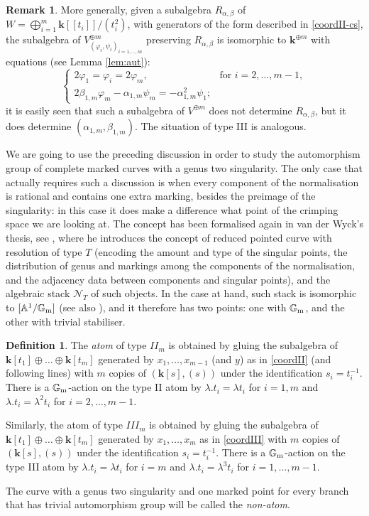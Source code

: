 \documentclass[11pt]{amsart}
\renewcommand{\k}{\mathbf k}
\newcommand{\Aaff}{\mathbb A}
\newcommand{\Gm}{\mathbb{G}_{\rm{m}}}
\theoremstyle{plain}
\theoremstyle{definition}
\newtheorem{dfn}[thm]{Definition}
\newtheorem{rem}[thm]{Remark}
\begin{document}
\begin{rem}
 More generally, given a subalgebra $R_{\alpha,\beta}$ of $W=\bigoplus_{i=1}^m\k[[t_i]]/(t_i^2)$, with generators of the form described in \eqref{coordII-cs}, the subalgebra of $V^{\oplus m}_{(\varphi_i,\psi_i)_{i=1,\ldots,m}}$ preserving $R_{\alpha,\beta}$ is isomorphic to $\k^{\oplus m}$ with equations (see Lemma \ref{lem:aut}):
 \[\begin{cases} 2\varphi_1=\varphi_i=2\varphi_m, & \text{for } i=2,\ldots,m-1,\\ 2\beta_{1,m}\varphi_m-\alpha_{1,m}\psi_m=-\alpha_{1,m}^2\psi_1;\end{cases}\]
 it is easily seen that such a subalgebra of $V^{\oplus m}$ does not determine $R_{\alpha,\beta}$, but it does determine $(\alpha_{1,m},\beta_{1,m})$. The situation of type III is analogous.
\end{rem}

We are going to use the preceding discussion in order to study the automorphism group of complete marked curves with a genus two singularity. The only case that actually requires such a discussion is when every component of the normalisation is rational and contains one extra marking, besides the preimage of the singularity: in this case it does make a difference what point of the crimping space we are looking at. The concept has been formalised again in van der Wyck's thesis, see \cite[Proposition 1.102, Theorem 1.105 and Corollary 1.106]{vdW}, where he introduces the concept of reduced pointed curve with resolution of type $T$ (encoding the amount and type of the singular points, the distribution of genus and markings among the components of the normalisation, and the adjacency data between components and singular points), and the algebraic stack $\mathcal N_T$ of such objects. In the case at hand, such stack is isomorphic to $[\Aaff^1/\Gm]$ (see also \cite[Examples 1.111-112]{vdW}), and it therefore has two points: one with $\Gm$, and the other with trivial stabiliser.

\begin{dfn}
 The \emph{atom} of type $I\!I_m$ is obtained by gluing the subalgebra of $\k[t_1]\oplus\ldots\oplus\k[t_m]$ generated by $x_1,\ldots,x_{m-1}$ (and $y$) as in \eqref{coordII} (and following lines) with $m$ copies of $(\k[s],(s))$ under the identification $s_i=t_i^{-1}$. There is a $\Gm$-action on the type II atom by $\lambda.t_i=\lambda t_i$ for $i=1,m$ and $\lambda.t_i=\lambda^2 t_i$ for $i=2,\ldots,m-1$.
 
 Similarly, the atom of type $I\!I\!I_m$ is obtained by gluing the subalgebra of $\k[t_1]\oplus\ldots\oplus\k[t_m]$ generated by $x_1,\ldots,x_m$ as in \eqref{coordIII} with $m$ copies of $(\k[s],(s))$ under the identification $s_i=t_i^{-1}$. There is a $\Gm$-action on the type III atom by $\lambda.t_i=\lambda t_i$ for $i=m$ and $\lambda.t_i=\lambda^3 t_i$ for $i=1,\ldots,m-1$.
 
 The curve with a genus two singularity and one marked point for every branch that has trivial automorphism group will be called the \emph{non-atom}.
\end{dfn}
\end{document}
